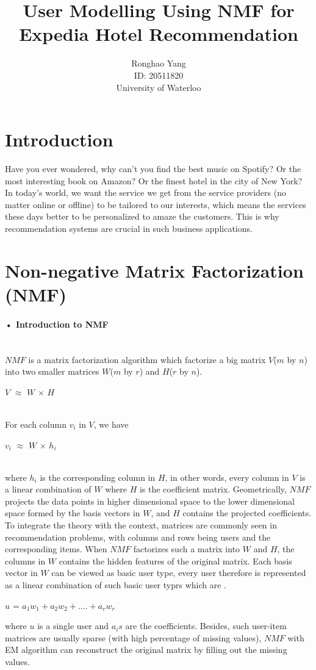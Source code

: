 \documentclass[11pt]{article} %
\title{User Modelling Using NMF for Expedia Hotel Recommendation}
\author{Ronghao Yang\\ID: 20511820\\University of Waterloo}
\begin{document}
\maketitle

\begin{abstract}

\end{abstract}
\section{Introduction}
Have you ever wondered, why can't you find the best music on Spotify? Or the most interesting book on Amazon? Or the finest hotel in the city of New York? In today's world, we want the service we get from the service providers (no matter online or offline) to be tailored to our interests, which means the services these days better to be personalized to amaze the customers. This is why recommendation systems are crucial in such business applications.\\

\section{Non-negative Matrix Factorization (NMF)}
\paragraph{• Introduction to NMF}\mbox{}\\
$NMF$ is a matrix factorization algorithm which factorize a big matrix $V$($m$ by $n$) into two smaller matrices $W$($m$ by $r$) and $H$($r$ by $n$). \\
\centerline{$V$ $\approx$ $W$ $\times$ $H$}\\
For each column $v_{i}$ in $V$, we have\\
\centerline{$v_{i}$ $\approx$ $W$ $\times$ $h_{i}$}\\
where $h_{i}$ is the corresponding column in $H$, in other words, every column in $V$ is a linear combination of $W$ where $H$ is the coefficient matrix. Geometrically, $NMF$ projects the data points in higher dimensional space to the lower dimensional space formed by the basis vectors in $W$, and $H$ contains the projected coefficients.\\
To integrate the theory with the context, matrices are commonly seen in recommendation problems, with columns and rows being users and the corresponding items. When $NMF$ factorizes such a matrix into $W$ and $H$, the columns in $W$ contains the hidden features of the original matrix. Each basis vector in $W$ can be viewed as basic user type, every user therefore is represented as a linear combination of such basic user typrs which are .\\
\centerline{$u$ = $a_1w_1+a_2w_2+....+a_rw_r$}
where $u$ is a single user and $a_is$ are the coefficients.
Besides, such user-item matrices are usually sparse (with high percentage of missing values), $NMF$ with EM algorithm can reconstruct the original matrix by filling out the missing values.\\
\end{document}
